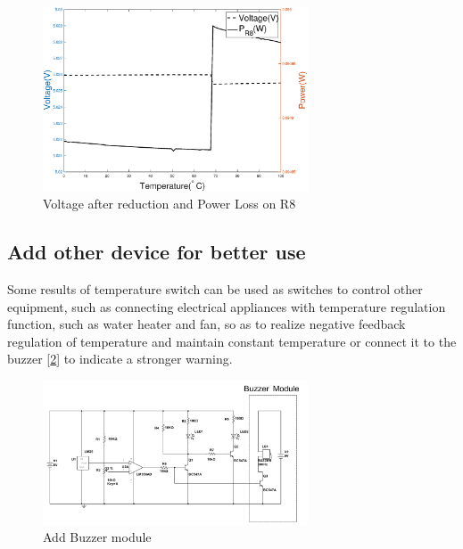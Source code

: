 \documentclass[12pt]{article}
\numberwithin{equation}{section}
\begin{document}
\begin{figure}[H] %
\centering %
\includegraphics[width=0.7\textwidth]{zener_diagram} %
\caption{Voltage after reduction and Power Loss on R8} %
\label{Fig.zener_diagram} %
\end{figure}


\subsection{Add other device for better use}
Some results of temperature switch can be used as switches to control other equipment, such as connecting electrical appliances with temperature regulation function, such as water heater and fan, so as to realize negative feedback regulation of temperature and maintain constant temperature or connect it to the buzzer [\ref{Fig.buzzer}] to indicate a stronger warning.


\begin{figure}[H] %
\centering %
\includegraphics[width=0.7\textwidth]{buzzer_module} %
\caption{Add Buzzer module} %
\label{Fig.buzzer} %
\end{figure}
\end{document}
